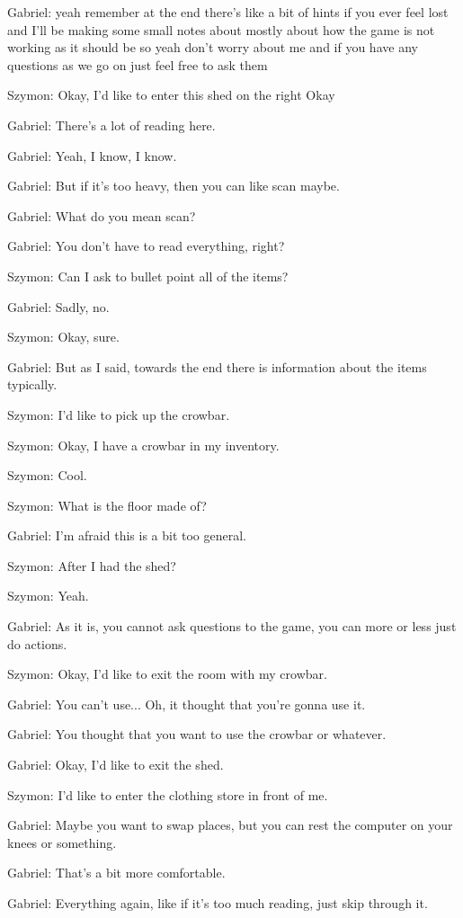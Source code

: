 Gabriel: yeah remember at the end there's like a bit of hints if you ever feel lost and I'll be making some small notes about mostly about how the game is not working as it should be so yeah don't worry about me and if you have any questions as we go on just feel free to ask them

Szymon: Okay, I'd like to enter this shed on the right Okay

Gabriel: There's a lot of reading here.

Gabriel: Yeah, I know, I know.

Gabriel: But if it's too heavy, then you can like scan maybe.

Gabriel: What do you mean scan?

Gabriel: You don't have to read everything, right?

Szymon: Can I ask to bullet point all of the items?

Gabriel: Sadly, no.

Szymon: Okay, sure.

Gabriel: But as I said, towards the end there is information about the items typically.

Szymon: I'd like to pick up the crowbar.

Szymon: Okay, I have a crowbar in my inventory.

Szymon: Cool.

Szymon: What is the floor made of?

Gabriel: I'm afraid this is a bit too general.

Szymon: After I had the shed?

Szymon: Yeah.

Gabriel: As it is, you cannot ask questions to the game, you can more or less just do actions.

Szymon: Okay, I'd like to exit the room with my crowbar.

Gabriel: You can't use... Oh, it thought that you're gonna use it.

Gabriel: You thought that you want to use the crowbar or whatever.

Gabriel: Okay, I'd like to exit the shed.

Szymon: I'd like to enter the clothing store in front of me.

Gabriel: Maybe you want to swap places, but you can rest the computer on your knees or something.

Gabriel: That's a bit more comfortable.

Gabriel: Everything again, like if it's too much reading, just skip through it.

